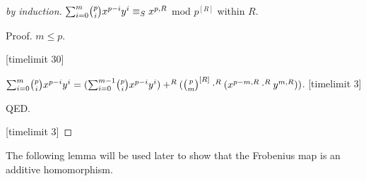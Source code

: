 \documentclass[11pt]{article}
\begin{document}
\begin{forthel}
\begin{proof}[by induction]


$\binsum{m}{p}{x}{y}{R}  
\equiv_{S} x^{p,R} $ mod $p^{[R]}$ within $R$.

Proof. $m \leq p$. 

[timelimit 30]

$\binsum{m}{p}{x}{y}{R} = 
(\binsum{m-1}{p}{x}{y}{R}) +^{R} (\cho{p}{m}^{[R]} \cdot^{R} (x^{p - m,R} \cdot^{R} y^{m,R}))$.
[timelimit 3]

QED.

[timelimit 3]

\end{proof}
\end{forthel}
The following lemma will be used later to show that the Frobenius
map is an additive homomorphism.
\end{document}
